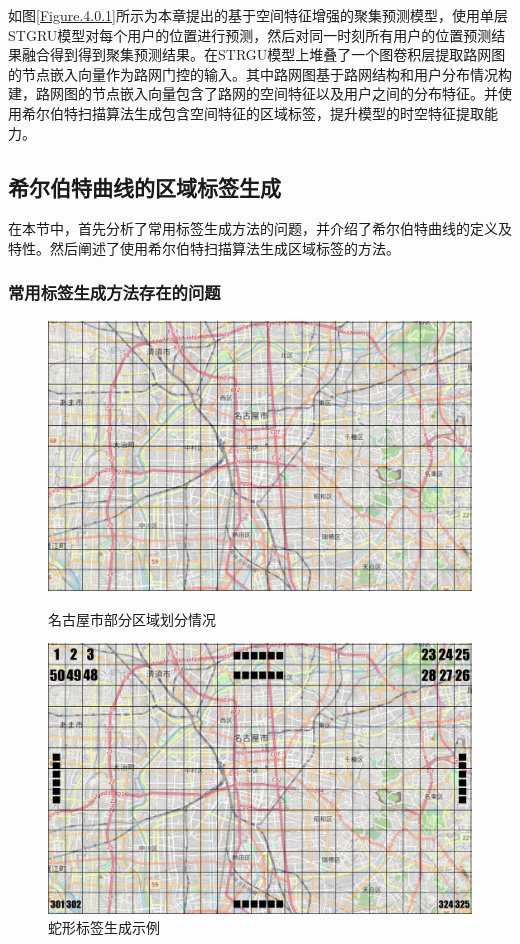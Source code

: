 \documentclass[master]{thesis-uestc}
\begin{document}
如图\ref{Figure.4.0.1}所示为本章提出的基于空间特征增强的聚集预测模型，使用单层STGRU模型对每个用户的位置进行预测，然后对同一时刻所有用户的位置预测结果融合得到得到聚集预测结果。在STRGU模型上堆叠了一个图卷积层提取路网图的节点嵌入向量作为路网门控的输入。其中路网图基于路网结构和用户分布情况构建，路网图的节点嵌入向量包含了路网的空间特征以及用户之间的分布特征。并使用希尔伯特扫描算法生成包含空间特征的区域标签，提升模型的时空特征提取能力。

\subsection{希尔伯特曲线的区域标签生成}
在本节中，首先分析了常用标签生成方法的问题，并介绍了希尔伯特曲线的定义及特性。然后阐述了使用希尔伯特扫描算法生成区域标签的方法。

\subsubsection{常用标签生成方法存在的问题}
\begin{figure}[!ht]
\centering 
\begin{minipage}[b]{0.45\textwidth}
\centering
\includegraphics[scale=0.25]{./pic/grid0.png}
\caption{名古屋市部分区域划分情况}
\label{Figure.4.1.1}
\end{minipage}
\begin{minipage}[b]{0.45\textwidth} 
\centering 
\includegraphics[scale=0.25]{./pic/grid1.png}
\caption{蛇形标签生成示例}
\label{Figure.4.1.2}
\end{minipage}
\end{figure}
\end{document}
